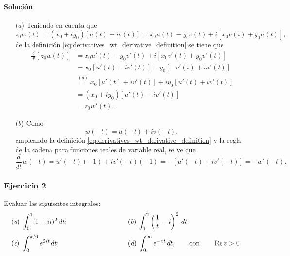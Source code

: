 \documentclass[a4paper]{report}
\renewcommand{\Re}{\operatorname{Re}}
\begin{document}
\paragraph{Solución}
\begin{enumerate}
 \item[(\textit{a})] Teniendo en cuenta que 
 \[
  z_0w(t)=(x_0+iy_0)[u(t)+iv(t)]=x_0u(t)-y_0v(t)+i[x_0v(t)+y_0u(t)],
 \]
 de la definición \ref{eq:derivatives_wt_derivative_definition} se tiene que 
 \begin{align*}
  \frac{d}{dt}[z_0w(t)]&=x_0u'(t)-y_0v'(t)+i[x_0v'(t)+y_0u'(t)]\\
    &=x_0[u'(t)+iv'(t)]+y_0[-v'(t)+iu'(t)]\\
    &\overset{(a)}{=}x_0[u'(t)+iv'(t)]+iy_0[u'(t)+iv'(t)]\\
    &=(x_0+iy_0)[u'(t)+iv'(t)]\\
    &=z_0w'(t).
 \end{align*}
 \item[(\textit{b})] Como
 \[
  w(-t)=u(-t)+iv(-t),
 \]
 empleando la definición \ref{eq:derivatives_wt_derivative_definition} y la regla de la cadena para funciones reales de variable real, se ve que 
 \[
  \frac{d}{dt}w(-t)=u'(-t)(-1)+iv'(-t)(-1)=-[u'(-t)+iv'(-t)]=-w'(-t).
 \]
\end{enumerate}

\subsubsection{Ejercicio 2}

Evaluar las siguientes integrales:
\[
 \begin{array}{ll}
  (\textit{a})\;\displaystyle\int_0^1(1+it)^2\,dt;\qquad\qquad\qquad\qquad&(\textit{b})\;\displaystyle\int_1^2\left(\frac{1}{t}-i\right)^2\,dt;\\[\bigskipamount]
  (\textit{c})\;\displaystyle\int_0^{\pi/6}e^{2it}\,dt;\qquad\qquad\qquad\qquad&(\textit{d})\;\displaystyle\int_0^\infty e^{-zt}\,dt,\qquad\textrm{con}\qquad\Re z>0.
 \end{array}
\]
\end{document}
